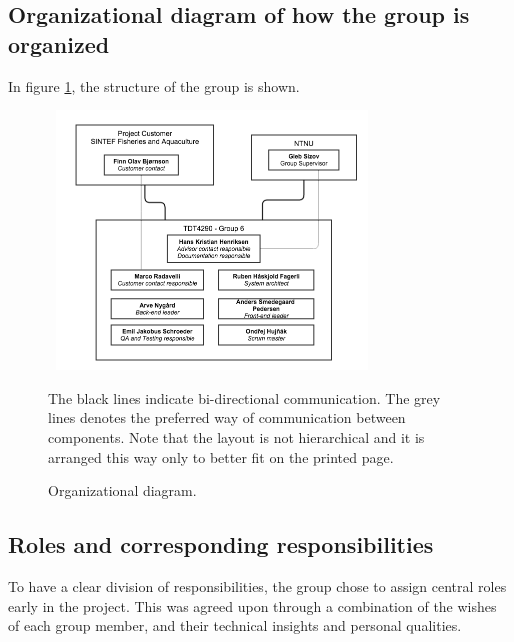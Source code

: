 \documentclass[11pt,a4paper,titlepage,oneside]{report}
\begin{document}
\subsection{Organizational diagram of how the group is organized}
In figure \ref{fig:organizational-structure}, the structure of the group is shown. 

\begin{figure}[h]
\begin{center}
\includegraphics[height=260px,width=328px]{img/tdt4290_group_6_organizational_structure.png}
\caption{Organizational diagram.}
\label{fig:organizational-structure}
\medskip
\small
The black lines indicate bi-directional communication. The grey lines denotes the preferred way of communication between components. Note that the layout is not hierarchical and it is arranged this way only to better fit on the printed page.
\end{center}
\end{figure}

\subsection{Roles and corresponding responsibilities}
To have a clear division of responsibilities, the group chose to assign central roles early in the project. This was agreed upon through a combination of the wishes of each group member, and their technical insights and personal qualities. 
\end{document}
